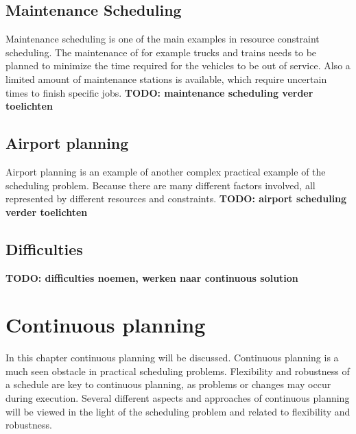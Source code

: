 \documentclass{article}
\newcommand{\TODO}[1]{{\color{red}\textbf{TODO: #1}}}
\begin{document}
\subsection{Maintenance Scheduling}
Maintenance scheduling is one of the main examples in resource constraint scheduling.
The maintenance of for example trucks and trains needs to be planned to minimize the time required for the vehicles to be out of service.
Also a limited amount of maintenance stations is available, which require uncertain times to finish specific jobs.
\TODO{maintenance scheduling verder toelichten}

\subsection{Airport planning}
Airport planning is an example of another complex practical example of the scheduling problem.
Because there are many different factors involved, all represented by different resources and constraints.
\TODO{airport scheduling verder toelichten}

\subsection{Difficulties}
\TODO{difficulties noemen, werken naar continuous solution}



\newpage

\section{Continuous planning}

In this chapter continuous planning will be discussed.
Continuous planning is a much seen obstacle in practical scheduling problems.
Flexibility and robustness of a schedule are key to continuous planning, as problems or changes may occur during execution.
Several different aspects and approaches of continuous planning will be viewed in the light of the scheduling problem and related to flexibility and robustness.
\end{document}
